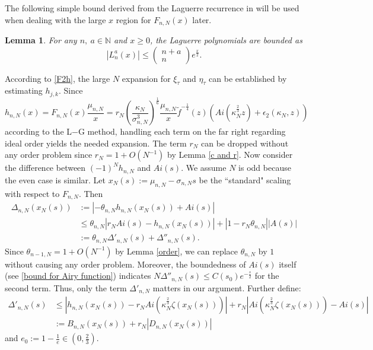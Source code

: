 \documentclass[11pt]{article}
\newtheorem{lemma}[theorem]{Lemma}
\numberwithin{equation}{section}%
\numberwithin{theorem}{section}
\begin{document}
The following simple bound derived from the Laguerre recurrence in \cite{szego1975orthogonal} will be used when dealing with the large $x$ region for $F_{n,N}(x)$ later.
\begin{lemma}\label{B4LagPoly}
For any $n,~a\in\mathbb{N}$ and $x\ge0$, the Laguerre polynomials are bounded as
\begin{equation}\label{B4Lag'}
        \left|L_n^a(x)\right|\le\left(\begin{matrix}
            n+a\\n
        \end{matrix}\right)e^{\frac{x}{2}}.
\end{equation}
\end{lemma}

According to \eqref{F2h}, the large $N$ expansion for $\xi_\tau$ and $\eta_\tau$ can be established by estimating $h_{j,k}$. Since
\begin{equation*}
     h_{n,N}(x)=F_{n,N}(x)\frac{\mu_{n,N}}{x}
     =r_N\left(\frac{\kappa_N}{\sigma_{n,N}^3}\right)^{\frac{1}{6}}\frac{\mu_{n,N}}{x}\tilde{f}^{-\frac{1}{4}}(z)\left(Ai\left(\kappa_N^{\frac{2}{3}}z\right)+\epsilon_2(\kappa_N,z)\right)
\end{equation*}
according to the L$-$G method, handling each term on the far right regarding ideal order yields the needed expansion. The term $r_N$ can be dropped without any order problem since $r_N=1+O\left(N^{-1}\right)$ by Lemma \ref{c and r}. Now consider the difference between $(-1)^Nh_{n,N}$ and $Ai(s)$. We assume $N$ is odd because the even case is similar. Let $x_N(s):=\mu_{n,N}-\sigma_{n,N}s$ be the ``standard" scaling with respect to $F_{n,N}$. Then
\begin{equation*}
\begin{split}
       \Delta_{n,N}(x_N(s))&:=|-\theta_{n,N}h_{n,N}(x_N(s))+Ai(s)|\\&\le \theta_{n,N}|r_N Ai(s)-h_{n,N}(x_N(s))|+|1-r_N \theta_{n,N}||A(s)|\\
       &:=\theta_{n,N}\Delta'_{n,N}(s)+\Delta''_{n,N}(s).
\end{split}
\end{equation*}
Since $\theta_{n-1,N}=1+O\left(N^{-1}\right)$ by Lemma \ref{order}, we can replace $\theta_{n,N}$ by $1$ without causing any order problem. Moreover, the boundedness of $Ai(s)$ itself (see \eqref{bound for Airy function}) indicates $N\Delta''_{n,N}(s)\le C(s_0)e^{-\frac{s}{2}}$ for the second term. Thus, only the term $\Delta'_{n,N}$ matters in our argument. Further define:
\begin{equation*}\begin{split}
     \Delta'_{n,N}(s)&\le \left|h_{n,N}(x_N(s))-r_NAi\left(\kappa_N^\frac{2}{3}\zeta(x_N(s))\right)\right|+r_N\left|Ai\left(\kappa_N^\frac{2}{3}\zeta(x_N(s))\right)-Ai(s)\right|\\
      &:= B_{n,N}(x_N(s))+r_N|D_{n,N}(x_N(s))|
\end{split}
\end{equation*} and $e_0:=1-\frac{1}{e}\in\left(0,\frac{2}{3}\right)$.
\end{document}
